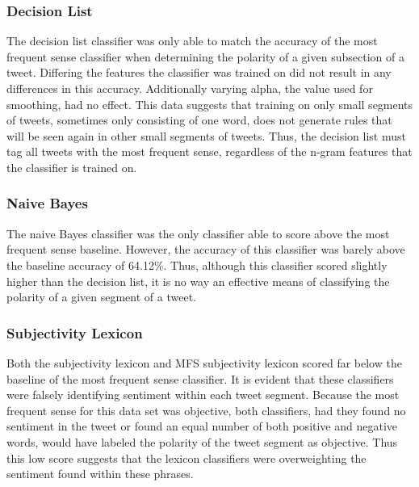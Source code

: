 \documentclass[11pt]{article}
\begin{document}
\subsubsection{Decision List}
The decision list classifier was only able to match the accuracy of the most frequent sense classifier when determining the polarity of a given subsection of a tweet. Differing the features the classifier was trained on did not result in any differences in this accuracy. Additionally varying alpha, the value used for smoothing, had no effect. This data suggests that training on only small segments of tweets, sometimes only consisting of one word, does not generate rules that will be seen again in other small segments of tweets. Thus, the decision list must tag all tweets with the most frequent sense, regardless of the n-gram features that the classifier is trained on. 

\subsubsection{Naive Bayes}
The naive Bayes classifier was the only classifier able to score above the most frequent sense baseline. However, the accuracy of this classifier was barely above the baseline accuracy of 64.12\%. Thus, although this classifier scored slightly higher than the decision list, it is no way an effective means of classifying the polarity of a given segment of a tweet.

\subsubsection{Subjectivity Lexicon}
Both the subjectivity lexicon and MFS subjectivity lexicon scored far below the baseline of the most frequent sense classifier. It is evident that these classifiers were falsely identifying sentiment within each tweet segment. Because the most frequent sense for this data set was objective, both classifiers, had they found no sentiment in the tweet or found an equal number of both positive and negative words, would have labeled the polarity of the tweet segment as objective. Thus this low score suggests that the lexicon classifiers were overweighting the sentiment found within these phrases. 
\end{document}
